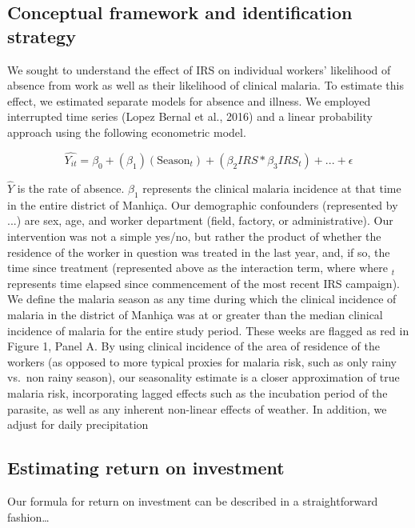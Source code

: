 \documentclass[]{article}
\begin{document}
\subsection{Conceptual framework and identification
strategy}\label{conceptual-framework-and-identification-strategy}

We sought to understand the effect of IRS on individual workers'
likelihood of absence from work as well as their likelihood of clinical
malaria. To estimate this effect, we estimated separate models for
absence and illness. We employed interrupted time series (Lopez Bernal
et al., 2016) and a linear probability approach using the following
econometric model.

\[
\hat{Y_{it}} = \beta_{0} +  (\beta_{1}) (\text{Season}_{t}) + (\beta_2{IRS}*\beta_3{IRS_t}) + ... + \epsilon
\]

\(\hat{Y}\) is the rate of absence. \(\beta_{1}\) represents the
clinical malaria incidence at that time in the entire district of
Manhiça. Our demographic confounders (represented by \(...\)) are sex,
age, and worker department (field, factory, or administrative). Our
intervention was not a simple yes/no, but rather the product of whether
the residence of the worker in question was treated in the last year,
and, if so, the time since treatment (represented above as the
interaction term, where where \(_t\) represents time elapsed since
commencement of the most recent IRS campaign). We define the malaria
season as any time during which the clinical incidence of malaria in the
district of Manhiça was at or greater than the median clinical incidence
of malaria for the entire study period. These weeks are flagged as red
in Figure 1, Panel A. By using clinical incidence of the area of
residence of the workers (as opposed to more typical proxies for malaria
risk, such as only rainy vs.~non rainy season), our seasonality estimate
is a closer approximation of true malaria risk, incorporating lagged
effects such as the incubation period of the parasite, as well as any
inherent non-linear effects of weather. In addition, we adjust for daily
precipitation

\subsection{Estimating return on
investment}\label{estimating-return-on-investment}

Our formula for return on investment can be described in a
straightforward fashion\ldots{}
\end{document}

